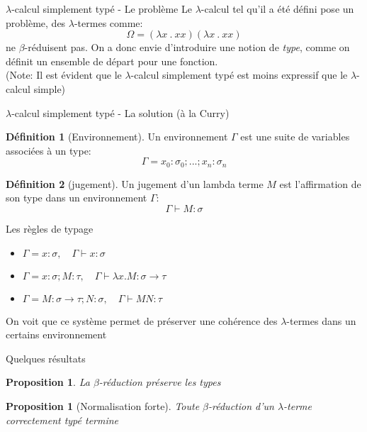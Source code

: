 \documentclass[11pt,a4paper]{beamer}
\theoremstyle{plain}
\newtheorem{prop}[thm]{Proposition}
\theoremstyle{definition}
\newtheorem{defn}{Définition}[section]
\theoremstyle{remark}
\begin{document}
\begin{frame}{$\lambda$-calcul simplement typé - Le problème}
Le $\lambda$-calcul tel qu'il a été défini pose un problème, des $\lambda$-termes comme:
$$ \Omega = (\lambda x \ . \ xx) (\lambda x \ . \ xx) $$
ne $\beta$-réduisent pas. On a donc envie d'introduire une notion de \emph{type}, comme on définit un ensemble de départ pour une fonction.
\\
(Note: Il est évident que le $\lambda$-calcul simplement typé est moins expressif que le $\lambda$-calcul simple)
\end{frame}

\begin{frame}{$\lambda$-calcul simplement typé - La solution (à la Curry)}
\begin{defn}[Environnement]
Un environnement $\Gamma$ est une suite de variables associées à un type: $$\Gamma = x_0:\sigma_0;...;x_n:\sigma_n$$
\end{defn}
\begin{defn}[jugement]
Un jugement d'un lambda terme $M$ est l'affirmation de son type dans un environnement $\Gamma$:
$$ \Gamma \vdash M : \sigma $$
\end{defn}
\end{frame}

\begin{frame}{Les règles de typage}
\begin{itemize}
	\item  $ \Gamma = x:\sigma, \quad \Gamma \vdash x : \sigma $
	\item  $ \Gamma = x:\sigma;M:\tau, \quad \Gamma \vdash \lambda x.M : \sigma \to \tau $
	\item  $ \Gamma = M:\sigma \to \tau; N: \sigma, \quad \Gamma \vdash MN : \tau $
\end{itemize}
On voit que ce système permet de préserver une cohérence des $\lambda$-termes dans un certains environnement
\end{frame}

\begin{frame}{Quelques résultats}
\begin{prop}
La $\beta$-réduction préserve les types
\end{prop}

\begin{prop}[Normalisation forte]
Toute $\beta$-réduction d'un $\lambda$-terme correctement typé termine
\end{prop}
\end{frame}
\end{document}
